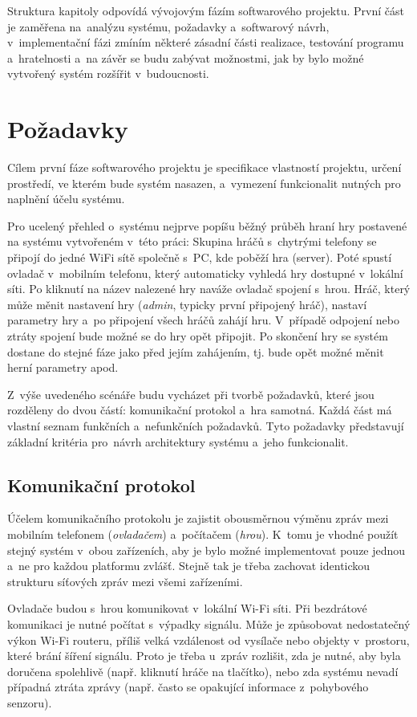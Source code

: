 \documentclass[thesis=B,czech,hidelinks]{FITthesis}[2012/06/26] %
\begin{document}
Struktura kapitoly odpovídá vývojovým fázím softwarového projektu. \cite{si} První část je zaměřena na~analýzu systému, požadavky a~softwarový návrh, v~implementační fázi zmíním některé zásadní části realizace, testování programu a~hratelnosti a~na závěr se budu zabývat možnostmi, jak by bylo možné vytvořený systém rozšířit v~budoucnosti.

\section{Požadavky}
\label{section:requirements}

Cílem první fáze softwarového projektu je specifikace vlastností projektu, určení prostředí, ve kterém bude systém nasazen, a~vymezení funkcionalit nutných pro naplnění účelu systému.

Pro ucelený přehled o~systému nejprve popíšu běžný průběh hraní hry postavené na systému vytvořeném v~této práci: Skupina hráčů s~chytrými telefony se připojí do jedné WiFi sítě společně s~PC, kde poběží hra (server). Poté spustí ovladač v~mobilním telefonu, který automaticky vyhledá hry dostupné v~lokální síti. Po kliknutí na název nalezené hry naváže ovladač spojení s~hrou. Hráč, který může měnit nastavení hry (\textit{admin}, typicky první připojený hráč), nastaví parametry hry a~po připojení všech hráčů zahájí hru. V~případě odpojení nebo ztráty spojení bude možné se do hry opět připojit. Po skončení hry se systém dostane do stejné fáze jako před jejím zahájením, tj. bude opět možné měnit herní parametry apod.

Z~výše uvedeného scénáře budu vycházet při tvorbě požadavků, které jsou rozděleny do dvou částí: komunikační protokol a~hra samotná. Každá část má vlastní seznam funkčních a~nefunkčních požadavků. Tyto požadavky představují základní kritéria pro~návrh architektury systému a~jeho funkcionalit.

\subsection{Komunikační protokol}

Účelem komunikačního protokolu je zajistit obousměrnou výměnu zpráv mezi mobilním telefonem (\textit{ovladačem}) a~počítačem (\textit{hrou}). K~tomu je vhodné použít stejný systém v~obou zařízeních, aby je bylo možné implementovat pouze jednou a~ne pro každou platformu zvlášť. Stejně tak je třeba zachovat identickou strukturu síťových zpráv mezi všemi zařízeními.

Ovladače budou s~hrou komunikovat v~lokální Wi-Fi síti. Při bezdrátové komunikaci je nutné počítat s~výpadky signálu. Může je způsobovat nedostatečný výkon Wi-Fi routeru, příliš velká vzdálenost od vysílače nebo objekty v~prostoru, které brání šíření signálu. Proto je třeba u~zpráv rozlišit, zda je nutné, aby byla doručena spolehlivě (např. kliknutí hráče na tlačítko), nebo zda systému nevadí případná ztráta zprávy (např. často se opakující informace z~pohybového senzoru). 
\end{document}
